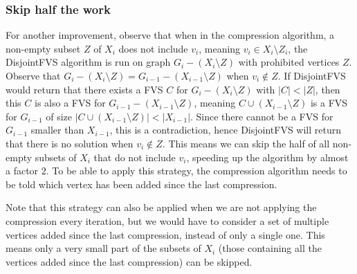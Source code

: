 \subsubsection{Skip half the work}
For another improvement, observe that when in the compression algorithm, a non-empty
subset $Z$ of $X_i$ does not include $v_i$, meaning $v_i \in X_i\setminus Z_i$, the {\sc DisjointFVS} algorithm is run
on graph $G_i-(X_i\setminus Z)$ with prohibited vertices $Z$. Observe that $G_i-(X_i\setminus Z) =
G_{i-1}-(X_{i-1}\setminus Z)$ when $v_i \not\in Z$. If {\sc DisjointFVS} would return that there exists a FVS $C$ for
$G_i-(X_i\setminus Z)$ with $|C|<|Z|$, then this $C$ is also a FVS for $G_{i-1}-(X_{i-1}\setminus Z)$, meaning $C \cup
(X_{i-1}\setminus Z)$ is a FVS for $G_{i-1}$ of size $|C \cup (X_{i-1}\setminus Z)| < |X_{i-1}|$. Since there cannot be
a FVS for $G_{i-1}$ smaller than $X_{i-1}$, this is a contradiction, hence {\sc DisjointFVS} will return that there is
no solution when $v_i \not\in Z$. This means we can skip the half of all non-empty subsets of $X_i$ that do not include
$v_i$, speeding up the algorithm by almost a factor $2$. To be able to apply this strategy, the compression algorithm
needs to be told which vertex has been added since the last compression.

Note that this strategy can also be applied when we are not applying the compression every iteration, but we would have
to consider a set of multiple vertices added since the last compression, instead of only a single one. This means only a
very small part of the subsets of $X_i$ (those containing all the vertices added since the last compression) can be
skipped.


